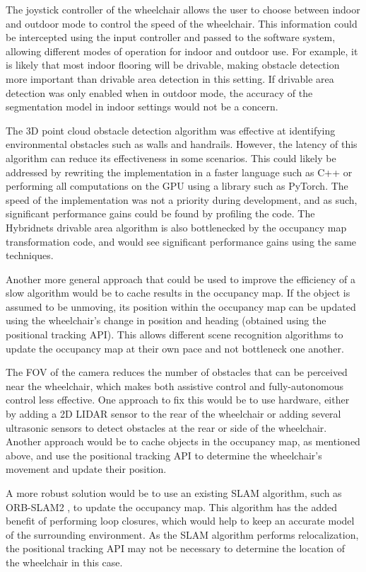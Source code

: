 The joystick controller of the wheelchair allows the user to choose between
indoor and outdoor mode to control the speed of the wheelchair. This information could be intercepted using
the input controller and passed to the software system, allowing different modes
of operation for indoor and outdoor use. For example, it is likely that
most indoor flooring will be drivable, making obstacle detection more important
than drivable area detection in this setting. If drivable area detection was
only enabled when in outdoor mode, the accuracy of the segmentation model
in indoor settings would not be a concern.

The 3D point cloud obstacle detection algorithm was effective
at identifying environmental obstacles such as walls and handrails.
However, the latency of this algorithm can reduce its effectiveness
in some scenarios. This could likely be addressed by rewriting the
implementation in a faster language such as C++ or performing all
computations on the GPU using a library such as PyTorch.
The speed of the implementation was not a priority during development,
and as such, significant performance gains could be found by
profiling the code. The Hybridnets drivable area
algorithm is also bottlenecked by the occupancy map transformation code,
and would see significant performance gains using the same techniques.

Another more general approach that could be used to improve the
efficiency of a slow algorithm would be to cache results in the occupancy map.
If the object is assumed to be unmoving, its position within the occupancy
map can be updated using the wheelchair's change in position and heading
(obtained using the positional tracking API). This allows different scene recognition
algorithms to update the occupancy map at their own pace and not bottleneck
one another.

The FOV of the camera reduces the number of obstacles that can be perceived near the wheelchair,
which makes both assistive control and fully-autonomous control less effective. One approach
to fix this would be to use hardware, either by adding a 2D LIDAR sensor to the rear of the
wheelchair or adding several ultrasonic sensors to detect obstacles at the rear or side
of the wheelchair. Another approach would be to cache objects in the occupancy map,
as mentioned above, and use the positional tracking API to determine the
wheelchair's movement and update their position.

A more robust solution would be
to use an existing SLAM algorithm, such as ORB-SLAM2 \cite{mur-artalORBSLAM2OpenSourceSLAM2017},
to update the occupancy map. This algorithm has the added benefit of performing
loop closures, which would help to keep an accurate model of the surrounding environment.
As the SLAM algorithm performs relocalization, the positional tracking API may not
be necessary to determine the location of the wheelchair in this case.

